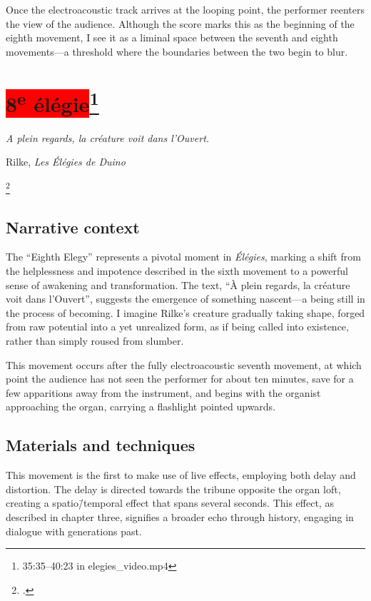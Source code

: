 \documentclass[12pt,twoside,maitrise]{dms_ks}
\theoremstyle{definition}
\begin{document}
{Once the electroacoustic track arrives at the looping point, the performer reenters the view of the audience. 
Although the score marks this as the beginning of the eighth movement, I see it as a liminal space between the seventh and eighth movements---a threshold where the boundaries between the two begin to blur.

\section{\colorbox{red}{8\textsuperscript{e} élégie}\footnote{35:35--40:23 in elegies\_video.mp4}}

\epigraph{\textit{A plein regards, la créature voit dans l’Ouvert.}}{Rilke, \textit{Les Élégies de Duino}\protect\footnotemark}

\footcitetext[75]{rilke_egies_1986}

\subsection{Narrative context}

The “Eighth Elegy” represents a pivotal moment in \textit{Élégies}, marking a shift from the helplessness and impotence described in the sixth movement to a powerful sense of awakening and transformation. 
The text, “À plein regards, la créature voit dans l’Ouvert”, suggests the emergence of something nascent---a being still in the process of becoming. 
I imagine Rilke's creature gradually taking shape, forged from raw potential into a yet unrealized form, as if being called into existence, rather than simply roused from slumber.

This movement occurs after the fully electroacoustic seventh movement, at which point the audience has not seen the performer for about ten minutes, save for a few apparitions away from the instrument, and begins with the organist approaching the organ, carrying a flashlight pointed upwards. 

\subsection{Materials and techniques}

This movement is the first to make use of live effects, employing both delay and distortion. 
The delay is directed towards the tribune opposite the organ loft, creating a spatio\=/temporal effect that spans several seconds. 
This effect, as described in chapter three, signifies a broader echo through history, engaging in dialogue with generations past. 

}
\end{document}
